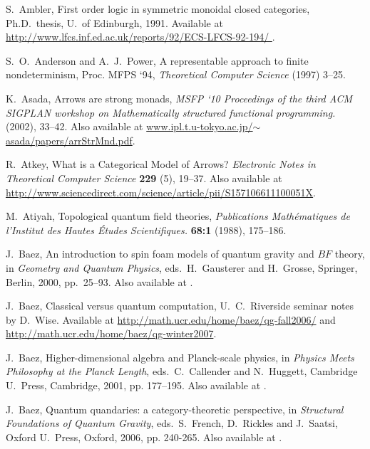 \documentclass[12pt,twoside,openright]{report}
\begin{document}
\begin{thebibliography}{99}
 S.\ Ambler, First order logic in symmetric monoidal closed categories, Ph.D.\ thesis, U.\ of Edinburgh, 1991. Available at 
\href{http://www.lfcs.inf.ed.ac.uk/reports/92/ECS-LFCS-92-194/}{http://www.lfcs.inf.ed.ac.uk/reports/92/ECS-LFCS-92-194/ }.

 S.\ O.\ Anderson and A.\ J.\ Power, A representable approach to finite nondeterminism, Proc. MFPS `94, \textsl{Theoretical Computer Science} (1997) 3--25.

 K.\ Asada, Arrows are strong monads, \textsl{MSFP `10 Proceedings of the third ACM SIGPLAN workshop on Mathematically structured functional programming.} (2002), 33--42.  Also available at \href{http://www.ipl.t.u-tokyo.ac.jp/~asada/papers/arrStrMnd.pdf}{www.ipl.t.u-tokyo.ac.jp/$\sim$asada/papers/arrStrMnd.pdf}.

 R.\ Atkey, What is a Categorical Model of Arrows? \emph{Electronic Notes in Theoretical Computer Science} \textbf{229} (5), 19--37.  Also available at\\ \href{http://www.sciencedirect.com/science/article/pii/S157106611100051X}{http://www.sciencedirect.com/science/article/pii/S157106611100051X}.

 M.\ Atiyah, Topological quantum field theories,
\textsl{Publications Math\'ematiques de l'Institut des Hautes \'Etudes Scientifiques.} \textbf{68:1} (1988), 175--186.

 J.\ Baez, An introduction to spin foam models of quantum gravity and $BF$ theory, in {\sl Geometry and Quantum Physics}, eds.\
H.\ Gausterer and H.\ Grosse, Springer, Berlin, 2000, pp.\ 25--93. Also available at .

 J.\ Baez, Classical versus quantum computation, U.\ C.\ Riverside seminar notes by D.\ Wise.  Available at
\href{http://math.ucr.edu/home/baez/qg-fall2006/index.html#computation}{http://math.ucr.edu/home/baez/qg-fall2006/} and\\ \href{http://math.ucr.edu/home/baez/qg-winter2007/index.html#computation}{http://math.ucr.edu/home/baez/qg-winter2007}.

 J.\ Baez, Higher-dimensional algebra and Planck-scale physics, in {\sl Physics Meets Philosophy at the Planck Length}, eds.\
C.\ Callender and N.\ Huggett, Cambridge U.\ Press, Cambridge,
2001, pp. 177--195.  Also available at \grqc{9902017}.

 J.\ Baez, Quantum quandaries: a category-theoretic perspective, in {\sl Structural Foundations of Quantum Gravity}, eds.\
S.\ French, D.\ Rickles and J.\ Saatsi, Oxford U.\ Press, Oxford,
2006, pp. 240-265.  Also available at .


\end{thebibliography}
\end{document}
